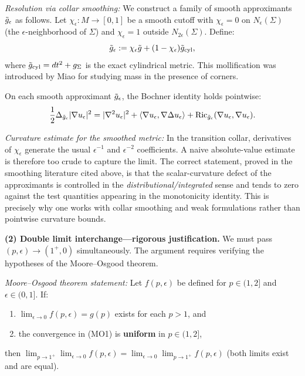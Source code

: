 \begin{remark}
\textit{Resolution via collar smoothing:} We construct a family of smooth approximants $\tilde{g}_\epsilon$ as follows. Let $\chi_\epsilon: M \to [0,1]$ be a smooth cutoff with $\chi_\epsilon = 0$ on $N_\epsilon(\Sigma)$ (the $\epsilon$-neighborhood of $\Sigma$) and $\chi_\epsilon = 1$ outside $N_{2\epsilon}(\Sigma)$. Define:
\[
\tilde{g}_\epsilon := \chi_\epsilon \tilde{g} + (1 - \chi_\epsilon) \tilde{g}_{\text{cyl}},
\]
where $\tilde{g}_{\text{cyl}} = dt^2 + g_\Sigma$ is the exact cylindrical metric. This mollification was introduced by Miao \cite{miao2002} for studying mass in the presence of corners.

On each smooth approximant $\tilde{g}_\epsilon$, the Bochner identity holds pointwise:
\[
\frac{1}{2}\Delta_{\tilde{g}_\epsilon}|\nabla u_\epsilon|^2 = |\nabla^2 u_\epsilon|^2 + \langle \nabla u_\epsilon, \nabla \Delta u_\epsilon \rangle + \mathrm{Ric}_{\tilde{g}_\epsilon}(\nabla u_\epsilon, \nabla u_\epsilon).
\]

\textit{Curvature estimate for the smoothed metric:} In the transition collar, derivatives of $\chi_\epsilon$ generate the usual $\epsilon^{-1}$ and $\epsilon^{-2}$ coefficients. A naive absolute-value estimate is therefore too crude to capture the limit. The correct statement, proved in the smoothing literature cited above, is that the scalar-curvature defect of the approximants is controlled in the \emph{distributional/integrated} sense and tends to zero against the test quantities appearing in the monotonicity identity. This is precisely why one works with collar smoothing and weak formulations rather than pointwise curvature bounds.

\textbf{(2) Double limit interchange---rigorous justification.} We must pass $(p, \epsilon) \to (1^+, 0)$ simultaneously. The argument requires verifying the hypotheses of the Moore--Osgood theorem.

\textit{Moore--Osgood theorem statement:} Let $f(p, \epsilon)$ be defined for $p \in (1, 2]$ and $\epsilon \in (0, 1]$. If:
\begin{enumerate}
    \item[(MO1)] $\lim_{\epsilon \to 0} f(p, \epsilon) = g(p)$ exists for each $p > 1$, and
    \item[(MO2)] the convergence in (MO1) is \textbf{uniform} in $p \in (1, 2]$,
\end{enumerate}
then $\lim_{p \to 1^+} \lim_{\epsilon \to 0} f(p, \epsilon) = \lim_{\epsilon \to 0} \lim_{p \to 1^+} f(p, \epsilon)$ (both limits exist and are equal).


\end{remark}

